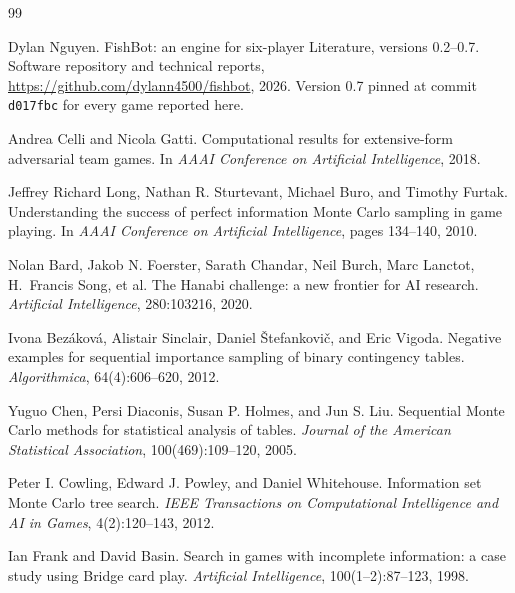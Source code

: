 \documentclass[11pt,a4paper]{article}
\begin{document}
\begin{thebibliography}{99}

Dylan Nguyen.
\newblock FishBot: an engine for six-player Literature, versions 0.2--0.7.
\newblock Software repository and technical reports,
  \url{https://github.com/dylann4500/fishbot}, 2026. Version 0.7 pinned at
  commit \texttt{d017fbc} for every game reported here.

Andrea Celli and Nicola Gatti.
\newblock Computational results for extensive-form adversarial team games.
\newblock In \emph{AAAI Conference on Artificial Intelligence}, 2018.

Jeffrey Richard Long, Nathan R. Sturtevant, Michael Buro, and Timothy Furtak.
\newblock Understanding the success of perfect information Monte Carlo sampling
in game playing.
\newblock In \emph{AAAI Conference on Artificial Intelligence}, pages 134--140,
2010.

Nolan Bard, Jakob N. Foerster, Sarath Chandar, Neil Burch, Marc Lanctot,
H.~Francis Song, et al.
\newblock The Hanabi challenge: a new frontier for AI research.
\newblock \emph{Artificial Intelligence}, 280:103216, 2020.

Ivona Bez\'akov\'a, Alistair Sinclair, Daniel \v{S}tefankovi\v{c}, and Eric
Vigoda.
\newblock Negative examples for sequential importance sampling of binary
contingency tables.
\newblock \emph{Algorithmica}, 64(4):606--620, 2012.

Yuguo Chen, Persi Diaconis, Susan P. Holmes, and Jun S. Liu.
\newblock Sequential Monte Carlo methods for statistical analysis of tables.
\newblock \emph{Journal of the American Statistical Association},
100(469):109--120, 2005.

Peter I. Cowling, Edward J. Powley, and Daniel Whitehouse.
\newblock Information set Monte Carlo tree search.
\newblock \emph{IEEE Transactions on Computational Intelligence and AI in
Games}, 4(2):120--143, 2012.

Ian Frank and David Basin.
\newblock Search in games with incomplete information: a case study using Bridge
card play.
\newblock \emph{Artificial Intelligence}, 100(1--2):87--123, 1998.


\end{thebibliography}
\end{document}
